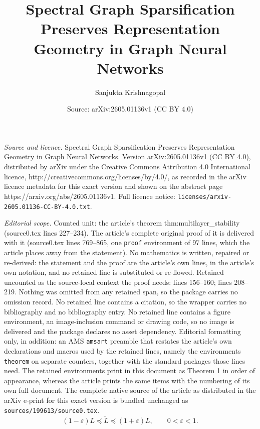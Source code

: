 \documentclass[10pt,a4paper]{amsart}
\title{Spectral Graph Sparsification Preserves Representation Geometry in Graph Neural Networks}
\author{Sanjukta Krishnagopal}
\date{Source: arXiv:2605.01136v1 (CC BY 4.0)}
\begin{document}
\maketitle

\noindent\emph{Source and licence.} Spectral Graph Sparsification Preserves Representation Geometry in Graph Neural Networks. Version arXiv:2605.01136v1 (CC BY 4.0), distributed by arXiv under the Creative Commons Attribution 4.0 International licence, http://creativecommons.org/licenses/by/4.0/, as recorded in the arXiv licence metadata for this exact version and shown on the abstract page https://arxiv.org/abs/2605.01136v1. Full licence notice: \texttt{licenses/arxiv-2605.01136-CC-BY-4.0.txt}.\par\smallskip

\noindent\textit{Editorial scope.} Counted unit: the article's theorem thm:multilayer\_stability (source0.tex lines 227--234). The article's complete original proof of it is delivered with it (source0.tex lines 769--865, one \texttt{proof} environment of 97 lines, which the article places away from the statement). No mathematics is written, repaired or re-derived: the statement and the proof are the article's own lines, in the article's own notation, and no retained line is substituted or re-flowed.  Retained uncounted as the source-local context the proof needs: lines 156--160; lines 208--219.  Nothing was omitted from any retained span, so the package carries no omission record.  No retained line contains a citation, so the wrapper carries no bibliography and no bibliography entry.  No retained line contains a figure environment, an image-inclusion command or drawing code, so no image is delivered and the package declares no asset dependency.  Editorial formatting only, in addition: an AMS \texttt{amsart} preamble that restates the article's own declarations and macros used by the retained lines, namely the environments \texttt{theorem} on separate counters, together with the standard packages those lines need.  The retained environments print in this document as Theorem 1 in order of appearance, whereas the article prints the same items with the numbering of its own full document.  The complete native source of the article as distributed in the arXiv e-print for this exact version is bundled unchanged as \texttt{sources/199613/source0.tex}.
\begin{equation}
(1-\varepsilon)L \preceq \widetilde L \preceq (1+\varepsilon)L,
\qquad 0<\varepsilon<1.
\label{eq:spectral_sparsifier}
\end{equation}
\end{document}
